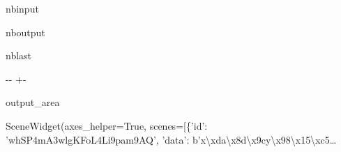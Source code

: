 \documentclass[letterpaper,10pt,english]{sphinxmanual}
\begin{document}
\begin{sphinxuseclass}{nbinput}
{
\begin{sphinxVerbatim}[commandchars=\\\{\}]
\llap{\color{nbsphinxin}[11]:\,\hspace{\fboxrule}\hspace{\fboxsep}}  
              
             
              
\end{sphinxVerbatim}
}

\end{sphinxuseclass}
\begin{sphinxuseclass}{nboutput}
\begin{sphinxuseclass}{nblast}
{

\kern-\sphinxverbatimsmallskipamount\kern-\baselineskip
\kern+\FrameHeightAdjust\kern-\fboxrule
\vspace{\nbsphinxcodecellspacing}

\begin{sphinxuseclass}{output_area}
\begin{sphinxuseclass}{}


\begin{sphinxVerbatim}[commandchars=\\\{\}]
\llap{\color{nbsphinxout}[11]:\,\hspace{\fboxrule}\hspace{\fboxsep}}SceneWidget(axes\_helper=True, scenes=[\{'id': 'whSP4mA3wlgKFoL4Li9pam9AQ', 'data': b'x\textbackslash{}xda\textbackslash{}x8d\textbackslash{}x9cy\textbackslash{}x98\textbackslash{}x15\textbackslash{}xc5…
\end{sphinxVerbatim}



\end{sphinxuseclass}
\end{sphinxuseclass}
}

\end{sphinxuseclass}
\end{sphinxuseclass}
\end{document}
